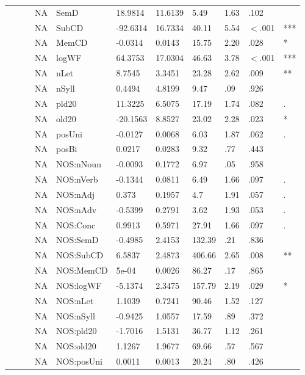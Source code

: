 \begin{table}[ht]
\begin{tabular}{lllllllllll}
   &  &  & NA & SemD & 18.9814 & 11.6139 & 5.49 & 1.63 & .102 &   \\ 
   &  &  & NA & SubCD & -92.6314 & 16.7334 & 40.11 & 5.54 & $<$.001 & *** \\ 
   &  &  & NA & MemCD & -0.0314 & 0.0143 & 15.75 & 2.20 & .028 & * \\ 
   &  &  & NA & logWF & 64.3753 & 17.0304 & 46.63 & 3.78 & $<$.001 & *** \\ 
   &  &  & NA & nLet & 8.7545 & 3.3451 & 23.28 & 2.62 & .009 & ** \\ 
   &  &  & NA & nSyll & 0.4494 & 4.8199 & 9.47 & .09 & .926 &   \\ 
   &  &  & NA & pld20 & 11.3225 & 6.5075 & 17.19 & 1.74 & .082 & . \\ 
   &  &  & NA & old20 & -20.1563 & 8.8527 & 23.02 & 2.28 & .023 & * \\ 
   &  &  & NA & posUni & -0.0127 & 0.0068 & 6.03 & 1.87 & .062 & . \\ 
   &  &  & NA & posBi & 0.0217 & 0.0283 & 9.32 & .77 & .443 &   \\ 
   &  &  & NA & NOS:nNoun & -0.0093 & 0.1772 & 6.97 & .05 & .958 &   \\ 
   &  &  & NA & NOS:nVerb & -0.1344 & 0.0811 & 6.49 & 1.66 & .097 & . \\ 
   &  &  & NA & NOS:nAdj & 0.373 & 0.1957 & 4.7 & 1.91 & .057 & . \\ 
   &  &  & NA & NOS:nAdv & -0.5399 & 0.2791 & 3.62 & 1.93 & .053 & . \\ 
   &  &  & NA & NOS:Conc & 0.9913 & 0.5971 & 27.91 & 1.66 & .097 & . \\ 
   &  &  & NA & NOS:SemD & -0.4985 & 2.4153 & 132.39 & .21 & .836 &   \\ 
   &  &  & NA & NOS:SubCD & 6.5837 & 2.4873 & 406.66 & 2.65 & .008 & ** \\ 
   &  &  & NA & NOS:MemCD & 5e-04 & 0.0026 & 86.27 & .17 & .865 &   \\ 
   &  &  & NA & NOS:logWF & -5.1374 & 2.3475 & 157.79 & 2.19 & .029 & * \\ 
   &  &  & NA & NOS:nLet & 1.1039 & 0.7241 & 90.46 & 1.52 & .127 &   \\ 
   &  &  & NA & NOS:nSyll & -0.9425 & 1.0557 & 17.59 & .89 & .372 &   \\ 
   &  &  & NA & NOS:pld20 & -1.7016 & 1.5131 & 36.77 & 1.12 & .261 &   \\ 
   &  &  & NA & NOS:old20 & 1.1267 & 1.9677 & 69.66 & .57 & .567 &   \\ 
   &  &  & NA & NOS:posUni & 0.0011 & 0.0013 & 20.24 & .80 & .426 &   \\ 

\end{tabular}
\end{table}
